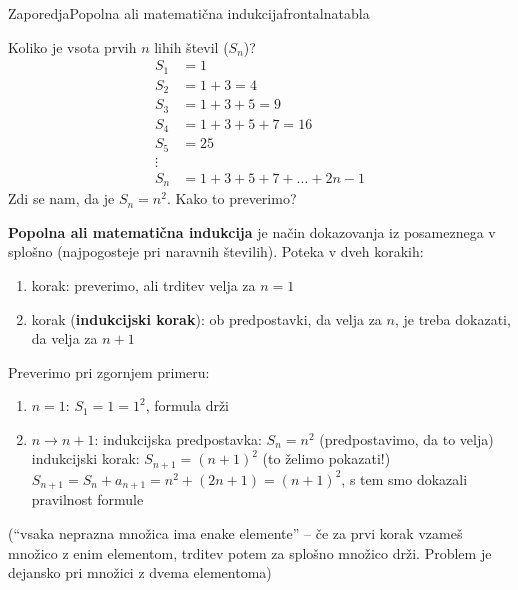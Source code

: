\begin{priprava}{}{}{Zaporedja}{Popolna ali matematična indukcija}{frontalna}{tabla}

Koliko je vsota prvih $ n $ lihih števil ($ S_n $)?
\begin{equation*}
    \begin{split}
S_1 & = 1 \\
S_2 & = 1 + 3 = 4 \\
S_3 & = 1 + 3 + 5 = 9 \\
S_4 & = 1 + 3 + 5 + 7 = 16 \\
S_5 & = 25 \\
\vdots \\
S_n & = 1 + 3 + 5 + 7 + \ldots + 2n - 1
    \end{split}
\end{equation*}
Zdi se nam, da je $ S_n = n^2 $. Kako to preverimo?

\textbf{Popolna ali matematična indukcija} je način dokazovanja iz posameznega v splošno (najpogosteje pri naravnih številih). Poteka v dveh korakih:
\begin{enumerate}
    \item korak: preverimo, ali trditev velja za $ n = 1 $
    \item korak (\textbf{indukcijski korak}): ob predpostavki, da velja za $ n $, je treba dokazati, da velja za $ n + 1 $
\end{enumerate}

Preverimo pri zgornjem primeru:
\begin{enumerate}
    \item $ n = 1 $: $ S_1 = 1 = 1^2 $, formula drži
    \item $ n \rightarrow n + 1 $:
        \subitem indukcijska predpostavka: $ S_n = n^2 $ (predpostavimo, da to velja)
        \subitem indukcijski korak: $ S_{n+1} = (n+1)^2 $ (to želimo pokazati!)
        \subitem $ S_{n+1} = S_n + a_{n+1} = n^2 + (2n + 1) = (n + 1)^2 $, s tem smo dokazali pravilnost formule
\end{enumerate}


 (``vsaka neprazna množica ima enake elemente'' -- če za prvi korak vzameš množico z enim elementom, trditev potem za splošno množico drži. Problem je dejansko pri množici z dvema elementoma)

\end{priprava}